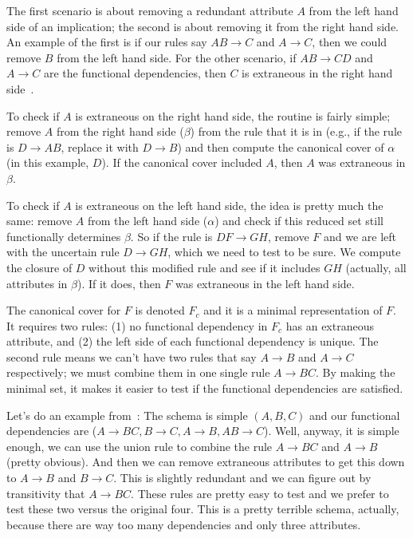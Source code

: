 The first scenario is about removing a redundant attribute $A$ from the left hand side of an implication; the second is about removing it from the right hand side. An example of the first is if our rules say $AB \rightarrow C$ and $A \rightarrow C$, then we could remove $B$ from the left hand side. For the other scenario, if $AB \rightarrow CD$ and $A \rightarrow C$ are the functional dependencies, then $C$ is extraneous in the right hand side~\cite{dsc}.

To check if $A$ is extraneous on the right hand side, the routine is fairly simple; remove $A$ from the right hand side ($\beta$) from the rule that it is in (e.g., if the rule is $D \rightarrow AB$, replace it with $D \rightarrow B$) and then compute the canonical cover of $\alpha$ (in this example, $D$). If the canonical cover included $A$, then $A$ was extraneous in $\beta$.

To check if $A$ is extraneous on the left hand side, the idea is pretty much the same: remove $A$ from the left hand side ($\alpha$) and check if this reduced set still functionally determines $\beta$. So if the rule is $DF \rightarrow GH$, remove $F$ and we are left with the uncertain rule $D \rightarrow GH$, which we need to test to be sure. We compute the closure of $D$ without this modified rule and see if it includes $GH$ (actually, all attributes in $\beta$). If it does, then $F$ was extraneous in the left hand side.

The canonical cover for $F$ is denoted $F_{c}$ and it is a minimal representation of $F$. It requires two rules: (1) no functional dependency in $F_{c}$ has an extraneous attribute, and (2) the left side of each functional dependency is unique. The second rule means we can't have two rules that say $A \rightarrow B$ and $A \rightarrow C$ respectively; we must combine them in one single rule $A \rightarrow BC$. By making the minimal set, it makes it easier to test if the functional dependencies are satisfied.

Let's do an example from~\cite{dsc}: The schema is simple $(A, B, C)$ and our functional dependencies are ($A \rightarrow BC, B \rightarrow C, A \rightarrow B, AB \rightarrow C$). Well, anyway, it is simple enough, we can use the union rule to combine the rule $A \rightarrow BC$ and $A \rightarrow B$ (pretty obvious). And then we can remove extraneous attributes to get this down to $A \rightarrow B$ and $B \rightarrow C$. This is slightly redundant and we can figure out by transitivity that $A \rightarrow BC$. These rules are pretty easy to test and we prefer to test these two versus the original four. This is a pretty terrible schema, actually, because there are way too many dependencies and only three attributes. 

